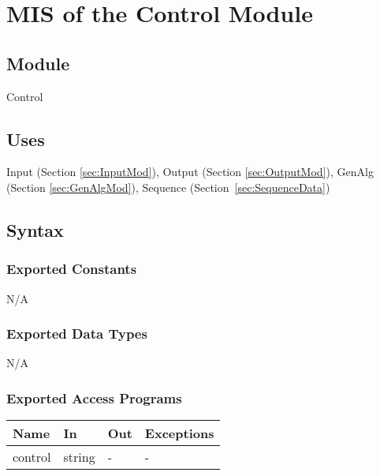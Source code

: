 \documentclass[12pt, titlepage]{article}
\begin{document}

\clearpage
\newpage
\section{MIS of the Control Module}

\subsection{Module}
Control

\subsection{Uses}

Input (Section \ref{sec:InputMod}), Output (Section \ref{sec:OutputMod}), 
GenAlg (Section \ref{sec:GenAlgMod}), Sequence (Section~\ref{sec:SequenceData})

\subsection{Syntax}

\subsubsection{Exported Constants}
N/A

\subsubsection{Exported Data Types}
N/A

\subsubsection{Exported Access Programs}

\begin{center}
\renewcommand*{\arraystretch}{1.5}
\begin{tabular} {p{}  p{}  p{} 
p{} } \hline 
\textbf{Name} & \textbf{In} & \textbf{Out} & \textbf{Exceptions} \\ \hline

  control & string & - & - \\ \hline
\end{tabular}
\end{center}
\end{document}
